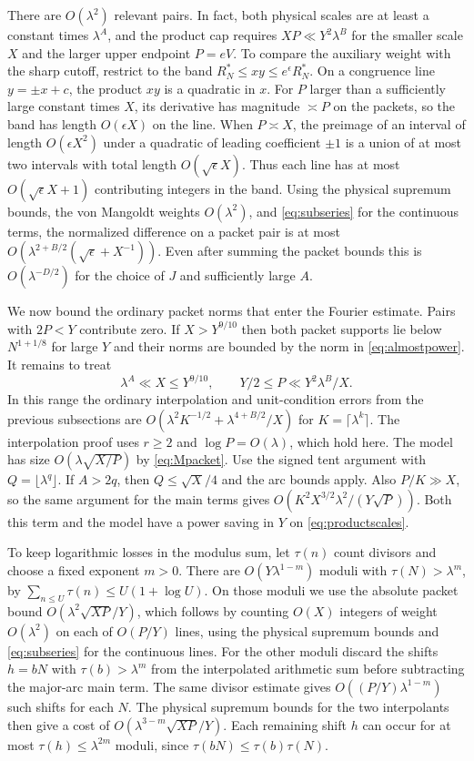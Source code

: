 \documentclass[11pt,a4paper]{article}
\numberwithin{equation}{section}
\begin{document}
There are $O(\lambda^2)$ relevant pairs. In fact, both physical
scales are at least a constant times $\lambda^A$, and the
product cap requires $XP\ll Y^2\lambda^B$ for the smaller
scale $X$ and the larger upper endpoint $P=eV$. To compare the
auxiliary weight with the sharp cutoff, restrict to the band
$R_N^*\le xy\le e^\epsilon R_N^*$. On a congruence line
$y=\pm x+c$, the product $xy$ is a quadratic in $x$.
For $P$ larger than a sufficiently large constant times $X$,
its derivative has magnitude $\asymp P$ on the packets,
so the band has length $O(\epsilon X)$ on the line.
When $P\asymp X$, the preimage of an interval of length
$O(\epsilon X^2)$ under a quadratic of leading coefficient
$\pm1$ is a union of at most two intervals with total length
$O(\sqrt{\epsilon}X)$. Thus each line has at most
$O(\sqrt{\epsilon}X+1)$ contributing integers in the band.
Using the physical supremum bounds, the von Mangoldt
weights $O(\lambda^2)$, and \cref{eq:subseries} for the
continuous terms, the normalized difference on a packet
pair is at most
$O(\lambda^{2+B/2}(\sqrt\epsilon+X^{-1}))$.
Even after summing the packet bounds this is $O(\lambda^{-D/2})$
for the choice of $J$ and sufficiently large $A$.

We now bound the ordinary packet norms that enter the
Fourier estimate. Pairs with
$2P<Y$ contribute zero. If $X>Y^{9/10}$ then both packet
supports lie below $N^{1+1/8}$ for large $Y$ and their norms
are bounded by the norm in \cref{eq:almostpower}. It remains
to treat
\begin{equation}
 \lambda^A\ll X\le Y^{9/10},\qquad
 Y/2\le P\ll Y^2\lambda^B/X .
 \label{eq:productscales}
\end{equation}
In this range the ordinary interpolation and unit-condition
errors from the previous subsections are
$O(\lambda^2 K^{-1/2}+\lambda^{4+B/2}/X)$ for
$K=\lceil\lambda^k\rceil$. The interpolation proof uses
$r\ge2$ and $\log P=O(\lambda)$, which hold here. The
model has size $O(\lambda\sqrt{X/P})$ by \cref{eq:Mpacket}.
Use the signed tent argument with $Q=\lfloor\lambda^q\rfloor$.
If $A>2q$, then $Q\le\sqrt X/4$ and the arc bounds apply.
Also $P/K\gg X$, so the same argument for the main terms
gives $O(K^2 X^{3/2}\lambda^2/(Y\sqrt P))$. Both this term
and the model have a power saving in $Y$ on
\cref{eq:productscales}.

To keep logarithmic losses in the modulus sum, let $\tau(n)$
count divisors and choose a fixed exponent $m>0$. There are
$O(Y\lambda^{1-m})$ moduli with $\tau(N)>\lambda^m$, by
$\sum_{n\le U}\tau(n)\le U(1+\log U)$. On those moduli
we use the absolute packet bound
$O(\lambda^2\sqrt{XP}/Y)$, which follows by counting $O(X)$
integers of weight $O(\lambda^2)$ on each of $O(P/Y)$
lines, using the physical supremum bounds and
\cref{eq:subseries} for the continuous lines.
For the other moduli discard the shifts $h=bN$ with
$\tau(b)>\lambda^m$ from the interpolated arithmetic
sum before subtracting the major-arc main term. The same
divisor estimate gives $O((P/Y)\lambda^{1-m})$ such
shifts for each $N$. The physical supremum bounds for the
two interpolants then give a cost of
$O(\lambda^{3-m}\sqrt{XP}/Y)$. Each remaining shift $h$
can occur for at most $\tau(h)\le\lambda^{2m}$ moduli,
since $\tau(bN)\le\tau(b)\tau(N)$.
\end{document}
